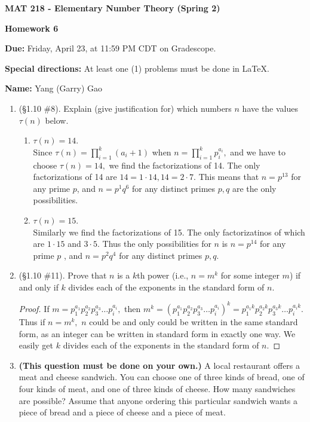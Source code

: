 \documentclass[11pt,a4paper]{article}
\begin{document}
\begin{Large}
\centerline{\bf MAT 218 - Elementary Number Theory (Spring 2)}\medskip
\centerline{\bf Homework 6}\medskip
\end{Large}
{\bf Due:} Friday, April 23, at 11:59 PM CDT on Gradescope.

{\bf Special directions:} At least one (1) problems must be done in \LaTeX.

{\bf Name:} Yang (Garry) Gao


\hrulefill

\begin{enumerate}

	\item (\S 1.10 \#8). Explain (give justification for) which numbers \(n\) have the values \(\tau(n)\) below.
	\begin{enumerate}
		\item \(\tau(n) = 14\).\\
			Since \( \tau (n)= \prod\limits^{k}_{i=1} (a_i+1) \) when \( n= \prod\limits^{k}_{i=1} p_i^{a_{i}},\) and we have to choose $\tau (n) = 14,$ we find the factorizations of 14. The only factorizations of 14 are $14 = 1 \cdot 14, 14= 2\cdot 7.$ This means that $n=p^{13}$ for any prime $p$, and $n=p^1q^6$ for any distinct primes $p, q$ are the only possibilities.
		\item \(\tau(n) = 15\).\\
			Similarly we find the factorizations of 15. The only factorizatinos of which are $1\cdot 15$ and $3\cdot 5$. Thus the only possibilities for $n$ is $n=p^{14}$ for any prime $p$ , and $n=p^2q^4$ for any distinct primes $p, q.$
	\end{enumerate}

	\item (\S 1.10 \#11). Prove that \(n\) is a \(k\)th power (i.e., \(n = m^{k}\) for some integer \(m\)) if and only if \(k\) divides each of the exponents in the standard form of \(n\).
	\begin{proof}
		If $m=p_1^{a_1}p_2^{a_2}p_3^{a_3}\ldots p_i^{a_i},$ then $m^k = (p_1^{a_1}p_2^{a_2}p_3^{a_3}\ldots p_i^{a_i})^k = p_1^{a_1k}p_2^{a_2k}p_3^{a_3k}\ldots p_i^{a_ik}.$ Thus if $n=m^k,$ $n$ could be and only could be written in the same standard form, as an integer can be written in standard form in exactly one way. We easily get $k$ divides each of the exponents in the standard form of $n$.
	\end{proof}

	\item \textbf{(This question must be done on your own.)} A local restaurant offers a meat and cheese sandwich. You can choose one of three kinds of bread, one of four kinds of meat, and one of three kinds of cheese.  How many sandwiches are possible?  Assume that anyone ordering this particular sandwich wants a piece of bread and a piece of cheese and a piece of meat.


\end{enumerate}
\end{document}
